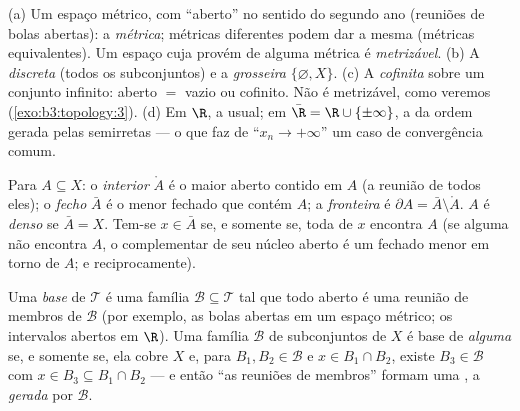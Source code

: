 \begin{example}\label{ex:b3:topology:examples}
(a) Um espaço métrico, com ``aberto'' no sentido do segundo ano
(reuniões de bolas abertas): a \emph{ métrica}; métricas
diferentes podem dar a mesma  (métricas equivalentes). Um
espaço cuja  provém de alguma métrica é \emph{metrizável}.
(b) A  \emph{discreta} (todos os subconjuntos) e a 
\emph{grosseira} $\{\varnothing, X\}$.
(c) A  \emph{cofinita} sobre um conjunto infinito: aberto
$=$ vazio ou cofinito. Não é metrizável, como veremos
(\cref{exo:b3:topology:3}).
(d) Em $\R$, a  usual; em $\bar\R = \R \cup
\{\pm\infty\}$, a  da ordem gerada
pelas semirretas --- o que faz de ``$x_n \to +\infty$'' um caso de convergência
comum.
\end{example}

\begin{definition}\label{def:b3:topology:interior}
Para $A \subseteq X$: o \emph{interior} $\mathring A$ é o maior aberto contido em $A$ (a
reunião de todos eles); o \emph{fecho} $\bar A$ é o
menor fechado que contém $A$; a \emph{fronteira} é $\partial A = \bar A
\setminus \mathring A$. $A$ é
\emph{denso} se $\bar A = X$. Tem-se $x \in \bar A$ se, e somente
se, toda  de $x$ encontra $A$ (se alguma  não
encontra $A$, o complementar de seu núcleo aberto é um fechado menor
em torno de $A$; e reciprocamente).
\end{definition}

\begin{definition}\label{def:b3:topology:basis}
Uma \emph{base} de $\mathcal T$ é uma família $\mathcal B \subseteq \mathcal T$
tal que todo aberto é uma reunião de membros de $\mathcal B$ (por exemplo, as
bolas abertas em um espaço métrico; os intervalos abertos em $\R$).
Uma família $\mathcal B$ de subconjuntos de $X$ é base de \emph{alguma}
 se, e somente se, ela cobre $X$ e, para $B_1, B_2 \in \mathcal B$ e $x \in B_1 \cap B_2$,
existe $B_3 \in \mathcal B$ com $x \in B_3 \subseteq B_1\cap B_2$ --- e então ``as reuniões de membros'' formam uma
, a  \emph{gerada} por $\mathcal B$.
\end{definition}

